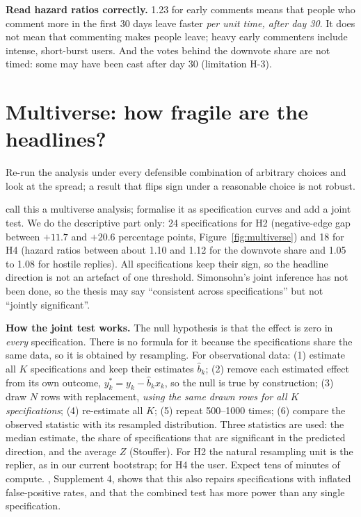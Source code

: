\begin{pitfall}
\textbf{Read hazard ratios correctly.} 1.23 for early comments means that people who comment more in the first 30 days leave faster \emph{per unit time, after day 30}. It does not mean that commenting makes people leave; heavy early commenters include intense, short-burst users. And the votes behind the downvote share are not timed: some may have been cast after day 30 (limitation H-3).
\end{pitfall}

\section{Multiverse: how fragile are the headlines?}\label{sec:multiverse}
\begin{idea}
Re-run the analysis under every defensible combination of arbitrary choices and look at the spread; a result that flips sign under a reasonable choice is not robust.
\end{idea}
 call this a multiverse analysis;  formalise it as specification curves and add a joint test. We do the descriptive part only: 24 specifications for H2 (negative-edge gap between $+11.7$ and $+20.6$ percentage points, Figure~\ref{fig:multiverse}) and 18 for H4 (hazard ratios between about 1.10 and 1.12 for the downvote share and 1.05 to 1.08 for hostile replies). All specifications keep their sign, so the headline direction is not an artefact of one threshold. Simonsohn's joint inference has not been done, so the thesis may say ``consistent across specifications'' but not ``jointly significant''.

\textbf{How the joint test works.} The null hypothesis is that the effect is zero in \emph{every} specification. There is no formula for it because the specifications share the same data, so it is obtained by resampling. For observational data: (1) estimate all $K$ specifications and keep their estimates $\hat b_k$; (2) remove each estimated effect from its own outcome, $y^*_k=y_k-\hat b_k x_k$, so the null is true by construction; (3) draw $N$ rows with replacement, \emph{using the same drawn rows for all $K$ specifications}; (4) re-estimate all $K$; (5) repeat 500--1000 times; (6) compare the observed statistic with its resampled distribution. Three statistics are used: the median estimate, the share of specifications that are significant in the predicted direction, and the average $Z$ (Stouffer). For H2 the natural resampling unit is the replier, as in our current bootstrap; for H4 the user. Expect tens of minutes of compute. , Supplement 4, shows that this also repairs specifications with inflated false-positive rates, and that the combined test has more power than any single specification.

